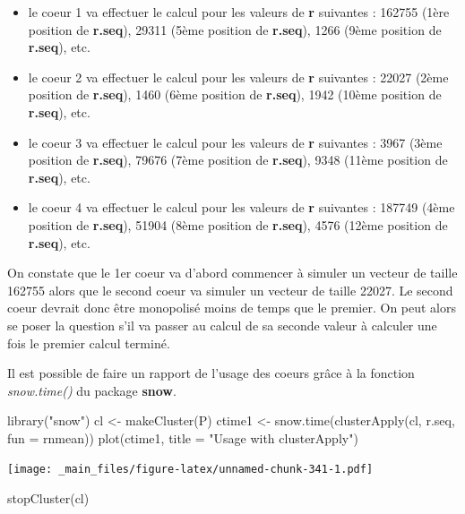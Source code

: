 \documentclass[
]{book}
\newenvironment{Shaded}{\begin{snugshade}}{\end{snugshade}}
\newcommand{\AttributeTok}[1]{\textcolor[rgb]{0.77,0.63,0.00}{#1}}
\newcommand{\FunctionTok}[1]{\textcolor[rgb]{0.00,0.00,0.00}{#1}}
\newcommand{\NormalTok}[1]{#1}
\newcommand{\OtherTok}[1]{\textcolor[rgb]{0.56,0.35,0.01}{#1}}
\newcommand{\StringTok}[1]{\textcolor[rgb]{0.31,0.60,0.02}{#1}}
\providecommand{\tightlist}{%
  \setlength{\itemsep}{0pt}\setlength{\parskip}{0pt}}
\theoremstyle{definition}
\theoremstyle{definition}
\theoremstyle{definition}
\theoremstyle{definition}
\theoremstyle{remark}
\begin{document}
\begin{itemize}
\tightlist
\item
  le coeur 1 va effectuer le calcul pour les valeurs de \textbf{r} suivantes : 162755 (1ère position de \textbf{r.seq}), 29311 (5ème position de \textbf{r.seq}), 1266 (9ème position de \textbf{r.seq}), etc.
\item
  le coeur 2 va effectuer le calcul pour les valeurs de \textbf{r} suivantes : 22027 (2ème position de \textbf{r.seq}), 1460 (6ème position de \textbf{r.seq}), 1942 (10ème position de \textbf{r.seq}), etc.
\item
  le coeur 3 va effectuer le calcul pour les valeurs de \textbf{r} suivantes : 3967 (3ème position de \textbf{r.seq}), 79676 (7ème position de \textbf{r.seq}), 9348 (11ème position de \textbf{r.seq}), etc.
\item
  le coeur 4 va effectuer le calcul pour les valeurs de \textbf{r} suivantes : 187749 (4ème position de \textbf{r.seq}), 51904 (8ème position de \textbf{r.seq}), 4576 (12ème position de \textbf{r.seq}), etc.
\end{itemize}

On constate que le 1er coeur va d'abord commencer à simuler un vecteur de taille 162755 alors que le second coeur va simuler un vecteur de taille 22027. Le second coeur devrait donc être monopolisé moins de temps que le premier. On peut alors se poser la question s'il va passer au calcul de sa seconde valeur à calculer une fois le premier calcul terminé.

Il est possible de faire un rapport de l'usage des coeurs grâce à la fonction \emph{snow.time()} du package \textbf{snow}.

\begin{Shaded}
\begin{Highlighting}[]
\FunctionTok{library}\NormalTok{(}\StringTok{"snow"}\NormalTok{)}
\NormalTok{cl }\OtherTok{\textless{}{-}} \FunctionTok{makeCluster}\NormalTok{(P) }
\NormalTok{ctime1 }\OtherTok{\textless{}{-}} \FunctionTok{snow.time}\NormalTok{(}\FunctionTok{clusterApply}\NormalTok{(cl, r.seq, }\AttributeTok{fun =}\NormalTok{ rnmean))}
\FunctionTok{plot}\NormalTok{(ctime1, }\AttributeTok{title =} \StringTok{"Usage with clusterApply"}\NormalTok{)}
\end{Highlighting}
\end{Shaded}

\texttt{[image: \_main\_files/figure-latex/unnamed-chunk-341-1.pdf]}

\begin{Shaded}
\begin{Highlighting}[]
\FunctionTok{stopCluster}\NormalTok{(cl) }
\end{Highlighting}
\end{Shaded}
\end{document}
